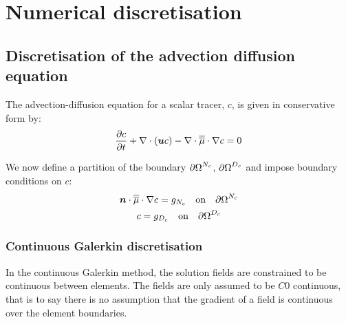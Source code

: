 \chapter{Numerical discretisation}\label{chap:numerical_discretisation}

\section{Discretisation of the advection diffusion equation}
\label{Sect:ND_advection_diffusion_discretisation}

The advection-diffusion equation for a scalar tracer, $c$,
is given in conservative form by:
\begin{equation}\label{eq:advdif}
  \frac{\partial c}{\partial t} + \nabla\cdot\left({\mbox{\boldmath$u$}} c\right) - \nabla\cdot\overline{\overline{\mu}}\cdot\nabla c = 0
\end{equation}

We now define a partition of the boundary ${\partial\Omega}^{N_c}$,
${\partial\Omega}^{D_c}$ and impose boundary conditions on $c$:
\begin{gather}
  \label{eq:cboundary}
  {\mbox{\boldmath$n$}}\cdot\overline{\overline{\mu}}\cdot\nabla c=g_{N_c} \quad\textrm{on}\quad {\partial\Omega}^{N_c}\\
  c=g_{D_c} \quad\textrm{on}\quad {\partial\Omega}^{D_c}
\end{gather}

\subsection{Continuous Galerkin discretisation}

In the continuous Galerkin method, the solution fields are constrained to be
continuous between elements. The fields are only assumed to be $C0$
continuous, that is to say there is no assumption that the gradient of a
field is continuous over the element boundaries.

